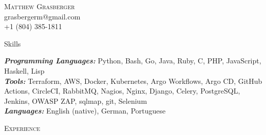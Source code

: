 \documentclass[9pt]{article}
\newenvironment{changemargin}[2]{%
  \begin{list}{}{%
    \setlength{\topsep}{0pt}%
    \setlength{\leftmargin}{#1}%
    \setlength{\rightmargin}{#2}%
    \setlength{\listparindent}{\parindent}%
    \setlength{\itemindent}{\parindent}%
    \setlength{\parsep}{\parskip}%
  }%
  \item[]}{\end{list}
}
\newcommand{\lineover}{
	\begin{changemargin}{-0.05in}{-0.05in}
		\vspace*{-8pt}
		\hrulefill \\
		\vspace*{-2pt}
	\end{changemargin}
}
\newcommand{\header}[1]{
	\begin{changemargin}{-0.5in}{-0.5in}
		\scshape{#1}\\
  	\lineover
	\end{changemargin}
}
\newcommand{\contact}[4]{
	\begin{changemargin}{-0.5in}{-0.5in}
		\begin{center}
			{\Large \scshape {#1}}\\ \smallskip
			{#2}\\ \smallskip 
			{#3}\\ \smallskip
			{#4}\smallskip
		\end{center}
	\end{changemargin}
}
\newenvironment{body} {
	\vspace*{-10pt}
	\begin{changemargin}{-0.25in}{-0.5in}
  }	
	{\end{changemargin}
}
\begin{document}
\contact{Matthew Grasberger}{grasbergerm@gmail.com}{+1 (804) 385-1811}


%
%
%
%
\header{Skills}

\begin{body}
	\vspace{14pt}
	\emph{\textbf{Programming Languages:}} Python, Bash, Go, Java, Ruby, C, PHP, JavaScript, Haskell, Lisp\\
	\smallskip
	\emph{\textbf{Tools:}} Terraform, AWS, Docker, Kubernetes, Argo Workflows, Argo CD, GitHub Actions, CircleCI, RabbitMQ, Nagios, Nginx, Django, Celery, PostgreSQL, Jenkins, OWASP ZAP, sqlmap, git, Selenium\\
	\smallskip
	\emph{\textbf{Languages:}} English (native), German, Portuguese\\
\end{body}
\vspace{10pt}
\header{Experience}
\end{document}
